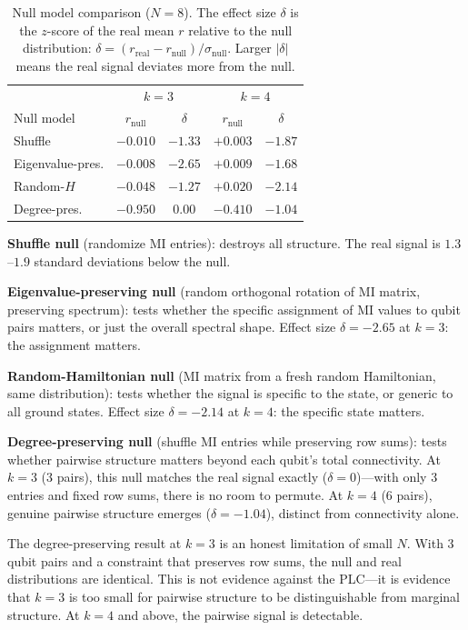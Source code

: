 \documentclass[aps,pra,twocolumn,superscriptaddress]{revtex4-2}
\begin{document}
\begin{table}[t]
\caption{Null model comparison ($N = 8$). The effect size $\delta$ is the $z$-score of the real mean $r$ relative to the null distribution: $\delta = (r_\text{real} - r_\text{null})/\sigma_\text{null}$. Larger $|\delta|$ means the real signal deviates more from the null.}
\label{tab:null}
\begin{ruledtabular}
\begin{tabular}{lcccc}
 & \multicolumn{2}{c}{$k = 3$} & \multicolumn{2}{c}{$k = 4$} \\
Null model & $r_\text{null}$ & $\delta$ & $r_\text{null}$ & $\delta$ \\
\colrule
Shuffle & $-0.010$ & $-1.33$ & $+0.003$ & $-1.87$ \\
Eigenvalue-pres. & $-0.008$ & $-2.65$ & $+0.009$ & $-1.68$ \\
Random-$H$ & $-0.048$ & $-1.27$ & $+0.020$ & $-2.14$ \\
Degree-pres. & $-0.950$ & $0.00$ & $-0.410$ & $-1.04$ \\
\end{tabular}
\end{ruledtabular}
\end{table}

\textbf{Shuffle null} (randomize MI entries): destroys all structure. The real signal is $1.3$--$1.9$ standard deviations below the null.

\textbf{Eigenvalue-preserving null} (random orthogonal rotation of MI matrix, preserving spectrum): tests whether the specific assignment of MI values to qubit pairs matters, or just the overall spectral shape. Effect size $\delta = -2.65$ at $k = 3$: the assignment matters.

\textbf{Random-Hamiltonian null} (MI matrix from a fresh random Hamiltonian, same distribution): tests whether the signal is specific to the state, or generic to all ground states. Effect size $\delta = -2.14$ at $k = 4$: the specific state matters.

\textbf{Degree-preserving null} (shuffle MI entries while preserving row sums): tests whether pairwise structure matters beyond each qubit's total connectivity. At $k = 3$ (3 pairs), this null matches the real signal exactly ($\delta = 0$)---with only 3 entries and fixed row sums, there is no room to permute. At $k = 4$ (6 pairs), genuine pairwise structure emerges ($\delta = -1.04$), distinct from connectivity alone.

The degree-preserving result at $k = 3$ is an honest limitation of small $N$. With 3 qubit pairs and a constraint that preserves row sums, the null and real distributions are identical. This is not evidence against the PLC---it is evidence that $k = 3$ is too small for pairwise structure to be distinguishable from marginal structure. At $k = 4$ and above, the pairwise signal is detectable.
\end{document}
